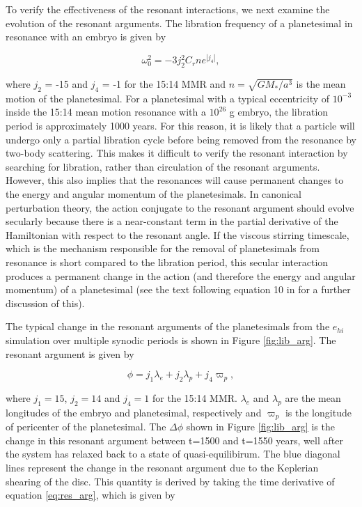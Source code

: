 To verify the effectiveness of the resonant interactions, we next examine the evolution of the resonant arguments. The libration 
frequency of a planetesimal in resonance with an embryo is given by \cite{murray00}

\begin{equation}\label{eq:lib_period}
    \omega_{0}^{2} = -3 j_{2}^{2} C_{r} n e^{\left| j_{4} \right|},
\end{equation}

\noindent where $j_{2}$ = -15 and $j_{4}$ = -1 for the 15:14 MMR and $n = \sqrt{G M_{*} / a^{3}}$ is the mean motion of the 
planetesimal. For a planetesimal with a typical eccentricity of $10^{-3}$ inside the 15:14 mean motion resonance with a 
$10^{26}$ g embryo, the libration period is approximately 1000 years. For this reason, it is likely that a particle will undergo only 
a partial libration cycle before being removed from the resonance by two-body scattering. This makes it difficult to verify the 
resonant interaction by searching for libration, rather than circulation of the resonant arguments. However, this also implies that 
the resonances will cause permanent changes to the energy and angular momentum of the planetesimals. In canonical 
perturbation theory, the action conjugate to the resonant argument should evolve secularly because there is a near-constant 
term in the partial derivative of the Hamiltonian with respect to the resonant angle. If the viscous stirring timescale, which is the 
mechanism responsible for the removal of planetesimals from resonance is short compared to the libration period, this secular 
interaction produces a permanent change in the action (and therefore the energy and angular momentum) of a planetesimal 
(see the text following equation 10 in \cite{weinberg07a} for a further discussion of this).

The typical change in the resonant arguments of the planetesimals from the $e_{hi}$ simulation over multiple synodic periods is 
shown in Figure \ref{fig:lib_arg}. The resonant argument is given by \cite{murray00}


\begin{equation}\label{eq:res_arg}
    \phi = j_{1} \lambda_{e} + j_{2} \lambda_{p} + j_{4} \varpi_{p},
\end{equation} 

\noindent where $j_{1} = 15$, $j_{2} = 14$ and $j_{4} = 1$ for the 15:14 MMR. $\lambda_{e}$ and $\lambda_{p}$ are the mean longitudes 
of the embryo and planetesimal, respectively and $\varpi_{p}$ is the longitude of pericenter of the planetesimal. The $\Delta 
\phi$ shown in Figure \ref{fig:lib_arg} is the change in this resonant argument between t=1500 and t=1550 years, well after the 
system has relaxed back to a state of quasi-equilibirum. The blue diagonal lines represent the change in the resonant argument 
due to the Keplerian shearing of the disc. This quantity is derived by taking the time derivative of equation \ref{eq:res_arg},  
which is given by

